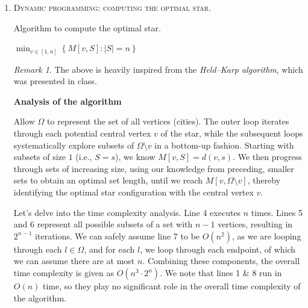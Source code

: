 \documentclass[12pt]{article}
\theoremstyle{definition}
\theoremstyle{remark}
\newtheorem*{remark}{Remark}
\begin{document}
\begin{enumerate}
  \newpage 
  \item \textsc{Dynamic programming: computing the optimal star.}  
  \begin{algorithm}
    \caption{Algorithm to compute the optimal star.}
    \BlankLine
    \BlankLine
{}
    \BlankLine
    
    \Return $\min_{v \in [1,n]} \left\{M[v, S] : |S| = n \right\}$


  \end{algorithm}

  \begin{remark} 
    The above is heavily inspired from the \textit{Held–Karp algorithm}, which was presented in class. 
  \end{remark}
  \textbf{Analysis of the algorithm}

\hspace{24pt} Allow $\Omega$ to represent the set of all vertices (cities). The outer loop iterates through each potential central vertex $v$ of the star, while the subsequent loops systematically explore subsets of $\Omega\setminus {v}$ in a bottom-up fashion. Starting with subsets of size $1$ (i.e., $S = {s}$), we know $M[v,S] = d(v, s)$. We then progress through sets of increasing size, using our knowledge from preceding, smaller sets to obtain an optimal set length, until we reach $M[v, \Omega\setminus v]$,  thereby identifying the optimal star configuration with the central vertex $v$. 

\hspace{24pt} Let's delve into the time complexity analysis. Line 4 executes $n$ times. Lines 5 and 6 represent all possible subsets of a set with $n-1$ vertices, resulting in $2^{n-1}$ iterations. We can safely assume line 7 to be $O(n^2)$, as we are looping through each $l \in \Omega$, and for each $l$, we loop through each endpoint, of which we can assume there are at most $n$. Combining these components, the overall time complexity is given as $O(n^3 \cdot 2^n)$. We note that lines 1 \& 8 run in $O(n)$ time, so they play no significant role in the overall time complexity of the algorithm. 


\end{enumerate}
\end{document}
